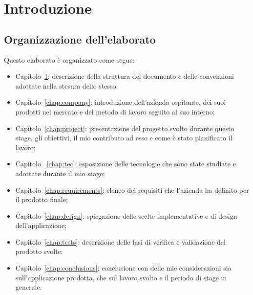 \mainmatter

\chapter{Introduzione}\label{chap:intro}

\section{Organizzazione dell'elaborato}
Questo elaborato è organizzato come segue: 
\begin{itemize}
	\item Capitolo~\ref{chap:intro}: descrizione della struttura del documento e delle convenzioni adottate nella stesura dello stesso;
	\item Capitolo~\ref{chap:company}: introduzione dell'azienda ospitante, dei suoi prodotti nel mercato e del metodo di lavoro seguito al suo interno;
	\item Capitolo~\ref{chap:project}: presentazione del progetto svolto durante questo stage, gli obiettivi, il mio contributo ad esso e come è stato pianificato il lavoro;
	\item Capitolo ~\ref{chap:tec}: esposizione delle tecnologie che sono state studiate e adottate durante il mio stage;
	\item Capitolo~\ref{chap:requirements}: elenco dei requisiti che l'azienda ha definito per il prodotto finale;
	\item Capitolo~\ref{chap:design}: spiegazione delle scelte implementative e di design dell'applicazione;
	\item Capitolo~\ref{chap:tests}: descrizione delle fasi di verifica e validazione del prodotto svolte:
	\item Capitolo~\ref{chap:conclusions}: conclusione con delle mie considerazioni sia sull'applicazione prodotta, che sul lavoro svolto e il periodo di stage in generale.
\end{itemize}

